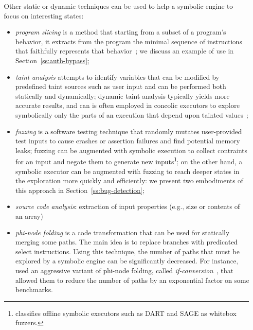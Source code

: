 Other static or dynamic techniques can be used to help a symbolic engine to focus on interesting states:
\begin{itemize}
  \item {\em program slicing} is a method that starting from a subset of a program's behavior, it extracts from the program the minimal sequence of instructions that faithfully represents that behavior~\cite{Weiser84}; we discuss an example of use in Section~\ref{ss:auth-bypass}; 
  \item {\em taint analysis}  attempts to identify variables that can be modified by predefined taint sources such as user input and can be performed both statically and dynamically; dynamic taint analysis typically yields more accurate results, and can is often employed in concolic executors to explore symbolically only the parts of an execution that depend upon tainted values~\cite{SAB-SP10};
  \item {\em fuzzing} is a software testing technique that randomly mutates user-provided test inputs to cause crashes or assertion failures and find potential memory leaks; fuzzing can be augmented with symbolic execution to collect contraints for an input and negate them to generate new inputs\footnote{\cite{DRILLER-NDSS16} classifies offline symbolic executors such as {\sc DART} and {\sc SAGE} as whitebox fuzzers.}; on the other hand, a symbolic executor can be augmented with fuzzing to reach deeper states in the exploration more quickly and efficiently: we present two embodiments of this approach in Section~\ref{ss:bug-detection}; 
  \item {\em source code analysis}: extraction of input properties (e.g., size or contents of an array)

  \item {\em phi-node folding} is a code transformation that can be used for statically merging some paths. The main idea is to replace branches with predicated select instructions. Using this technique, the number of paths that must be explored by a symbolic engine can be significantly decreased. For instance,~\cite{CCK-EUROSYS11} used an aggressive variant of phi-node folding, called {\em if-conversion}~\cite{CCF-CGO03}, that allowed them to reduce the number of paths by an exponential factor on some benchmarks.


\end{itemize}
